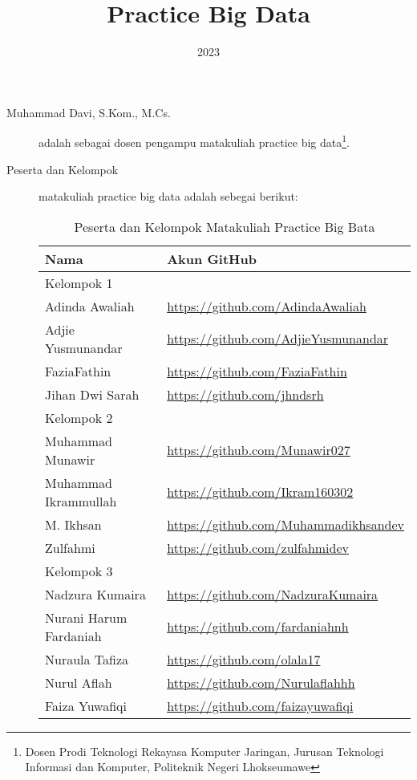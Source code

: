 \documentclass[a4paper]{tufte-handout}
\title{Practice Big Data}
\date{2023}
\begin{document}
\maketitle


\begin{projects}
\begin{description}
\item [Muhammad Davi, S.Kom., M.Cs.] adalah sebagai dosen pengampu matakuliah practice big data\footnote{Dosen Prodi Teknologi Rekayasa Komputer Jaringan, Jurusan Teknologi Informasi dan Komputer, Politeknik Negeri Lhokseumawe}.
\item [Peserta dan Kelompok] matakuliah practice big data adalah sebegai berikut:

\begin{table}[!ht]
\caption{Peserta dan Kelompok Matakuliah Practice Big Bata}
\label{tab:peserta}
\centering
\begin{tabular}{ll} 
\toprule
Nama &	Akun GitHub\\
\midrule
Kelompok 1\\
\midrule
Adinda Awaliah			& \url{https://github.com/AdindaAwaliah} \\
Adjie Yusmunandar		& \url{https://github.com/AdjieYusmunandar} \\
FaziaFathin				& \url{https://github.com/FaziaFathin} \\
Jihan Dwi Sarah			& \url{https://github.com/jhndsrh} \\
\midrule
Kelompok 2\\
\midrule
Muhammad Munawir		& \url{https://github.com/Munawir027} \\
Muhammad Ikrammullah	& \url{https://github.com/Ikram160302} \\
M. Ikhsan				& \url{https://github.com/Muhammadikhsandev} \\
Zulfahmi				& \url{https://github.com/zulfahmidev} \\
\midrule
Kelompok 3\\
\midrule
Nadzura Kumaira			& \url{https://github.com/NadzuraKumaira} \\
Nurani Harum Fardaniah	& \url{https://github.com/fardaniahnh} \\
Nuraula Tafiza			& \url{https://github.com/olala17} \\
Nurul Aflah				& \url{https://github.com/Nurulaflahhh} \\
Faiza Yuwafiqi			& \url{https://github.com/faizayuwafiqi} \\

\end{tabular}
\end{table}
\end{description}
\end{projects}
\end{document}
